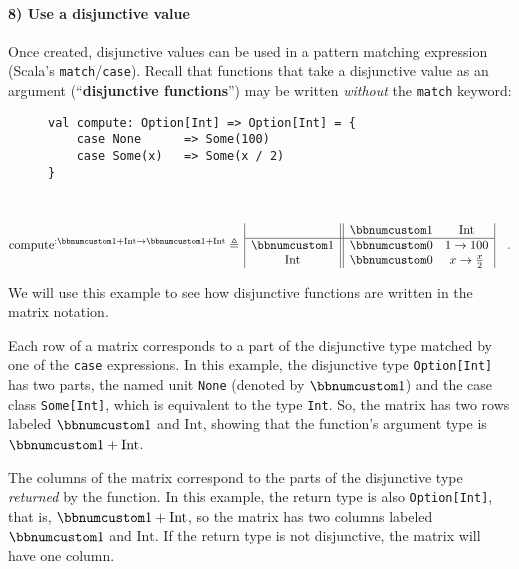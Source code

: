 \paragraph{8) Use a disjunctive value}

Once created, disjunctive values can be used in a pattern matching
expression (Scala\textsf{'}s \lstinline!match!/\lstinline!case!). Recall
that functions that take a disjunctive value as an argument (\textsf{``}\textbf{disjunctive
functions}\textsf{''}) may be written \emph{without} the \lstinline!match!
keyword:

\begin{wrapfigure}{l}{0.5\columnwidth}%
\vspace{-0.65\baselineskip}
\begin{lstlisting}
val compute: Option[Int] => Option[Int] = {
    case None      => Some(100)
    case Some(x)   => Some(x / 2)
}
\end{lstlisting}

\vspace{-1.65\baselineskip}
\end{wrapfigure}%

~\vspace{-1.45\baselineskip}
\[
\text{compute}^{:\bbnum 1+\text{Int}\rightarrow\bbnum 1+\text{Int}}\triangleq\,\begin{array}{|c||cc|}
 & \bbnum 1 & \text{Int}\\
\hline \bbnum 1 & \bbnum 0 & 1\rightarrow100\\
\text{Int} & \bbnum 0 & x\rightarrow\frac{x}{2}
\end{array}\quad.
\]
\vspace{-0.9\baselineskip}

We will use this example to see how disjunctive functions are written
in the matrix notation.

Each row of a matrix corresponds to a part of the disjunctive type
matched by one of the \lstinline!case! expressions. In this example,
the disjunctive type \lstinline!Option[Int]! has two parts, the named
unit \lstinline!None! (denoted by $\bbnum 1$) and the case class
\lstinline!Some[Int]!, which is equivalent to the type \lstinline!Int!.
So, the matrix has two rows labeled $\bbnum 1$ and $\text{Int}$,
showing that the function\textsf{'}s argument type is $\bbnum 1+\text{Int}$.

The columns of the matrix correspond to the parts of the disjunctive
type \emph{returned} by the function. In this example, the return
type is also \lstinline!Option[Int]!, that is, $\bbnum 1+\text{Int}$,
so the matrix has two columns labeled $\bbnum 1$ and $\text{Int}$.
If the return type is not disjunctive, the matrix will have one column.

